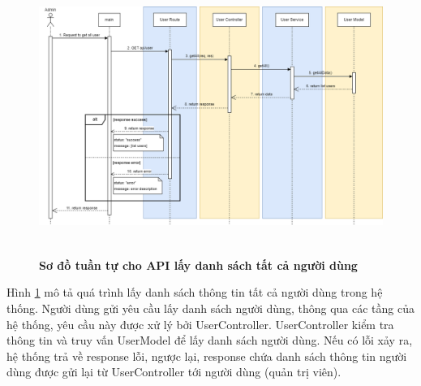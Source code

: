\begin{figure}[H]
  \centering
  \includegraphics[width=16cm,height=9cm]{Images/sequence_api/getAllUsers.png}
  \caption[Sơ đồ tuần tự cho API lấy danh sách tất cả người dùng ]{\bfseries \fontsize{12pt}{0pt}
  \selectfont Sơ đồ tuần tự cho API lấy danh sách tất cả người dùng }
  \label{getAllUser} %
\end{figure}
Hình \ref{getAllUser} mô tả quá trình lấy danh sách thông tin tất cả người dùng trong hệ thống. Người dùng gửi yêu cầu lấy danh sách người dùng, thông qua các tầng của hệ thống, yêu cầu này được xử lý bởi UserController. UserController kiểm tra thông tin và truy vấn UserModel để lấy danh sách người dùng. 
Nếu có lỗi xảy ra, hệ thống trả về response lỗi, ngược lại, response chứa danh sách thông tin người dùng được gửi lại từ UserController tới người dùng (quản trị viên).

